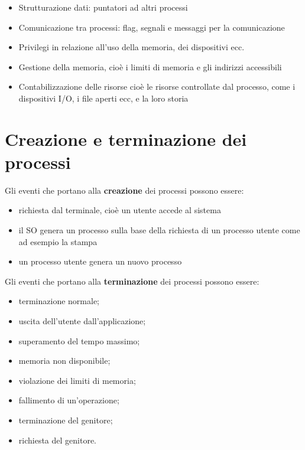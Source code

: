 \documentclass[12pt, letterpaper]{report}
\begin{document}
\begin{itemize}
\begin{itemize}
\begin{itemize}
					\item se in attesa, l'evento per il quale è in attesa.
				\end{itemize}
				\item Strutturazione dati: puntatori ad altri processi
				\item Comunicazione tra processi: flag, segnali e messaggi per la comunicazione
				\item Privilegi in relazione all'uso della memoria, dei dispositivi ecc.
				\item Gestione della memoria, cioè i limiti di memoria e gli indirizzi accessibili
				\item Contabilizzazione delle risorse cioè le risorse controllate dal processo, come i dispositivi I/O, i file aperti ecc, e la loro storia
			\end{itemize}
	\end{itemize}
	\section{Creazione e terminazione dei processi}
	Gli eventi che portano alla \textbf{creazione} dei processi possono essere:
	\begin{itemize}
		\item richiesta dal terminale, cioè un utente accede al sistema
		\item il SO genera un processo sulla base della richiesta di un processo utente come ad esempio la stampa
		\item un processo utente genera un nuovo processo
	\end{itemize}
	Gli eventi che portano alla \textbf{terminazione} dei processi possono essere:
	\begin{itemize}
		\item terminazione normale;
		\item uscita dell'utente dall'applicazione;
		\item superamento del tempo massimo;
		\item memoria non disponibile;
		\item violazione dei limiti di memoria;
		\item fallimento di un'operazione;
		\item terminazione del genitore;
		\item richiesta del genitore.
	\end{itemize}
\end{document}
